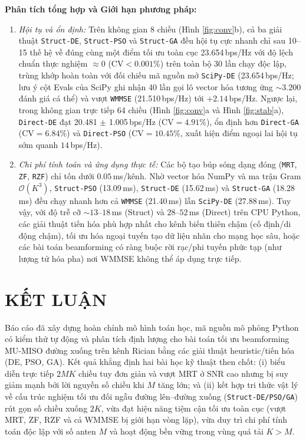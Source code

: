 \documentclass[12pt, a4paper]{article}
\begin{document}
\textbf{Phân tích tổng hợp và Giới hạn phương pháp:}
\begin{enumerate}
    \item \emph{Hội tụ và ổn định:} Trên không gian 8 chiều (Hình \ref{fig:conv}b), cả ba giải thuật \texttt{Struct-DE}, \texttt{Struct-PSO} và \texttt{Struct-GA} đều hội tụ cực nhanh chỉ sau 10--15 thế hệ về đúng cùng một điểm tối ưu toàn cục 23.654\,bps/Hz với độ lệch chuẩn thực nghiệm $\approx 0$ ($\text{CV} < 0.001\%$) trên toàn bộ 30 lần chạy độc lập, trùng khớp hoàn toàn với đối chiếu mã nguồn mở \texttt{SciPy-DE} (23.654\,bps/Hz; lưu ý cột Evals của SciPy ghi nhận 40 lần gọi lô vector hóa tương ứng $\sim 3.200$ đánh giá cá thể) và vượt \texttt{WMMSE} (21.510\,bps/Hz) tới $+2.14$\,bps/Hz. Ngược lại, trong không gian trực tiếp 64 chiều (Hình \ref{fig:conv}a và Hình \ref{fig:stab}a), \texttt{Direct-DE} đạt 20.481 $\pm$ 1.005\,bps/Hz ($\text{CV} = 4.91\%$), ổn định hơn \texttt{Direct-GA} ($\text{CV} = 6.84\%$) và \texttt{Direct-PSO} ($\text{CV} = 10.45\%$, xuất hiện điểm ngoại lai hội tụ sớm quanh $14$\,bps/Hz).
    \item \emph{Chi phí tính toán và ứng dụng thực tế:} Các bộ tạo búp sóng dạng đóng (\texttt{MRT}, \texttt{ZF}, \texttt{RZF}) chỉ tốn dưới $0.05$\,ms/kênh. Nhờ vector hóa NumPy và ma trận Gram $\mathcal{O}(K^3)$, \texttt{Struct-PSO} (13.09\,ms), \texttt{Struct-DE} (15.62\,ms) và \texttt{Struct-GA} (18.28\,ms) đều chạy nhanh hơn cả \texttt{WMMSE} (21.40\,ms) lẫn \texttt{SciPy-DE} (27.88\,ms). Tuy vậy, với độ trễ cỡ $\sim 13\text{--}18$\,ms (Struct) và $28\text{--}52$\,ms (Direct) trên CPU Python, các giải thuật tiến hóa phù hợp nhất cho kênh biến thiên chậm (cố định/di động chậm), tối ưu hóa ngoại tuyến tạo dữ liệu nhãn cho mạng học sâu, hoặc các bài toán beamforming có ràng buộc rời rạc/phi tuyến phức tạp (như lượng tử hóa pha) nơi WMMSE không thể áp dụng trực tiếp.
\end{enumerate}

\section{KẾT LUẬN}
Báo cáo đã xây dựng hoàn chỉnh mô hình toán học, mã nguồn mô phỏng Python có kiểm thử tự động và phân tích định lượng cho bài toán tối ưu beamforming MU-MISO đường xuống trên kênh Rician bằng các giải thuật heuristic/tiến hóa (DE, PSO, GA). Kết quả khẳng định hai bài học kỹ thuật then chốt: (i) biểu diễn trực tiếp $2MK$ chiều tuy đơn giản và vượt MRT ở SNR cao nhưng bị suy giảm mạnh bởi lời nguyền số chiều khi $M$ tăng lớn; và (ii) kết hợp tri thức vật lý về cấu trúc nghiệm tối ưu đối ngẫu đường lên--đường xuống (\texttt{Struct-DE/PSO/GA}) rút gọn số chiều xuống $2K$, vừa đạt hiệu năng tiệm cận tối ưu toàn cục (vượt MRT, ZF, RZF và cả WMMSE bị giới hạn vòng lặp), vừa duy trì chi phí tính toán độc lập với số anten $M$ và hoạt động bền vững trong vùng quá tải $K > M$.

\newpage


\end{document}
